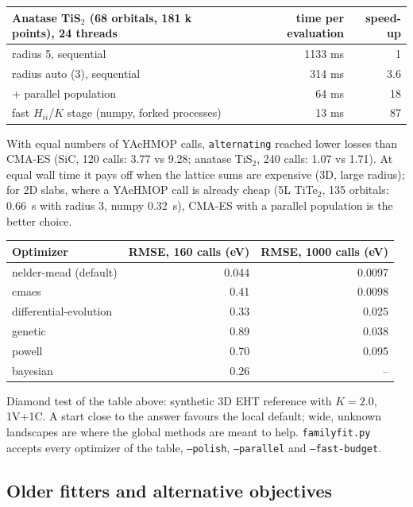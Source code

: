 \documentclass[11pt,a4paper]{article}
\newcommand{\cmd}[1]{\texttt{#1}}
\renewcommand{\_}{\origunderscore\allowbreak}
\begin{document}
\begin{center}\small
\begin{tabular}{lrr}
\toprule
Anatase TiS$_2$ (68 orbitals, 181 k points), 24 threads & time per evaluation & speed-up \\
\midrule
radius 5, sequential & 1133 ms & 1 \\
radius auto (3), sequential & 314 ms & 3.6 \\
+ parallel population & 64 ms & 18 \\
fast $H_{ii}$/$K$ stage (numpy, forked processes) & 13 ms & 87 \\
\bottomrule
\end{tabular}
\end{center}
With equal numbers of YAeHMOP calls, \cmd{alternating} reached lower losses than CMA-ES (SiC, 120 calls: 3.77 vs
9.28; anatase TiS$_2$, 240 calls: 1.07 vs 1.71). At equal wall time it pays off when the lattice sums are expensive (3D,
large radius); for 2D slabs, where a YAeHMOP call is already cheap (5L TiTe$_2$, 135 orbitals: 0.66~s with radius 3,
numpy 0.32~s), CMA-ES with a parallel population is the better choice.

\begin{center}
\begin{tabular}{lrr}
\toprule
Optimizer & RMSE, 160 calls (eV) & RMSE, 1000 calls (eV) \\
\midrule
nelder-mead (default) & 0.044 & 0.0097 \\
cmaes & 0.41 & 0.0098 \\
differential-evolution & 0.33 & 0.025 \\
genetic & 0.89 & 0.038 \\
powell & 0.70 & 0.095 \\
bayesian & 0.26 & -- \\
\bottomrule
\end{tabular}
\end{center}

Diamond test of the table above: synthetic 3D EHT reference with $K=2.0$, 1V+1C. A start close to the
answer favours the local default; wide, unknown landscapes are where the global methods are meant to
help. \cmd{family\_fit.py} accepts every optimizer of the table, \cmd{--polish}, \cmd{--parallel} and
\cmd{--fast-budget}.

\subsection{Older fitters and alternative objectives}
\end{document}
